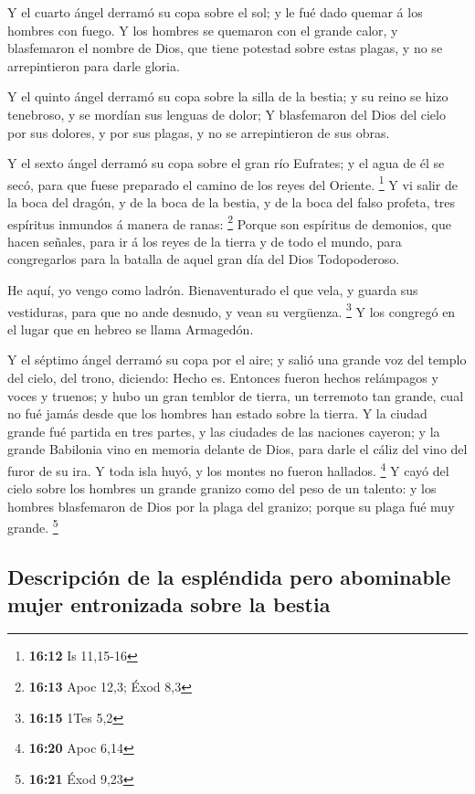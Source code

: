  Y el cuarto ángel derramó su copa sobre el sol; y le fué
dado quemar á los hombres con fuego.  Y los hombres se
quemaron con el grande calor, y blasfemaron el nombre de Dios, que tiene
potestad sobre estas plagas, y no se arrepintieron para darle gloria.

 Y el quinto ángel derramó su copa sobre la silla de la
bestia; y su reino se hizo tenebroso, y se mordían sus lenguas de dolor;
 Y blasfemaron del Dios del cielo por sus dolores, y por
sus plagas, y no se arrepintieron de sus obras.

 Y el sexto ángel derramó su copa sobre el gran río
Eufrates; y el agua de él se secó, para que fuese preparado el camino de
los reyes del Oriente. \footnote{\textbf{16:12} Is 11,15-16}
 Y vi salir de la boca del dragón, y de la boca de la
bestia, y de la boca del falso profeta, tres espíritus inmundos á manera
de ranas: \footnote{\textbf{16:13} Apoc 12,3; Éxod 8,3} 
Porque son espíritus de demonios, que hacen señales, para ir á los reyes
de la tierra y de todo el mundo, para congregarlos para la batalla de
aquel gran día del Dios Todopoderoso.

 He aquí, yo vengo como ladrón. Bienaventurado el que
vela, y guarda sus vestiduras, para que no ande desnudo, y vean su
vergüenza. \footnote{\textbf{16:15} 1Tes 5,2}  Y los
congregó en el lugar que en hebreo se llama Armagedón.

 Y el séptimo ángel derramó su copa por el aire; y salió
una grande voz del templo del cielo, del trono, diciendo: Hecho es.
 Entonces fueron hechos relámpagos y voces y truenos; y
hubo un gran temblor de tierra, un terremoto tan grande, cual no fué
jamás desde que los hombres han estado sobre la tierra. 
Y la ciudad grande fué partida en tres partes, y las ciudades de las
naciones cayeron; y la grande Babilonia vino en memoria delante de Dios,
para darle el cáliz del vino del furor de su ira.  Y toda
isla huyó, y los montes no fueron hallados. \footnote{\textbf{16:20}
  Apoc 6,14}  Y cayó del cielo sobre los hombres un
grande granizo como del peso de un talento: y los hombres blasfemaron de
Dios por la plaga del granizo; porque su plaga fué muy grande.
\footnote{\textbf{16:21} Éxod 9,23}

\hypertarget{descripciuxf3n-de-la-espluxe9ndida-pero-abominable-mujer-entronizada-sobre-la-bestia}{%
\subsection{Descripción de la espléndida pero abominable mujer
entronizada sobre la
bestia}\label{descripciuxf3n-de-la-espluxe9ndida-pero-abominable-mujer-entronizada-sobre-la-bestia}}

